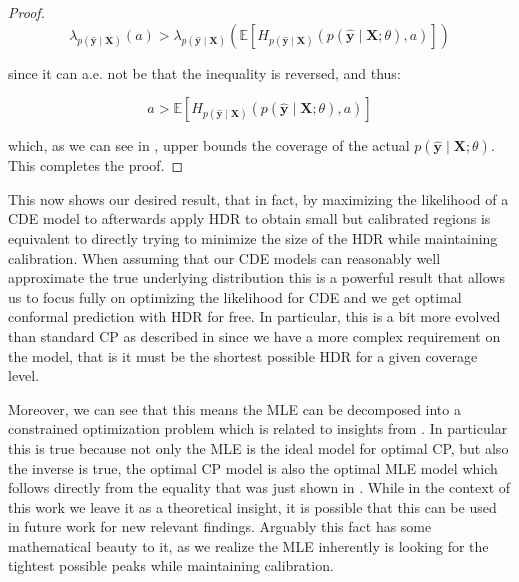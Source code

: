 \begin{proof}
    \begin{equation}
        \lambda_{p(\mathbf{\hat{y}}\mid\mathbf{X})}(a) > \lambda_{p(\mathbf{\hat{y}}\mid\mathbf{X})}\left(
        \mathbb{E}\left[H_{p(\hat{\mathbf{y}}\mid \mathbf{X})}(p(\mathbf{\hat{y}}\mid \mathbf{X};
            \theta), a)
            \right] \right)
    \end{equation}

    since it can a.e. not be that the inequality is reversed, and thus:

    \begin{equation}
        a > \mathbb{E}\left[H_{p(\hat{\mathbf{y}}\mid \mathbf{X})}(p(\mathbf{\hat{y}}\mid \mathbf{X};\theta), a)\right]
    \end{equation}

    which, as we can see in , upper bounds the coverage of the actual $p(\mathbf{\hat{y}}\mid \mathbf{X};\theta)$. This completes the proof.

\end{proof}
This now shows our desired result, that in fact, by maximizing the likelihood of a CDE model to afterwards apply HDR to obtain small but calibrated regions is equivalent to directly trying to minimize the size of the HDR while maintaining calibration. When assuming that our CDE models can reasonably well approximate the true underlying distribution this is a powerful result that allows us to focus fully on optimizing the likelihood for CDE and we get optimal conformal prediction with HDR for free. In particular, this is a bit more evolved than standard CP as described in  since we have a more complex requirement on the model, that is it must be the shortest possible HDR for a given coverage level.

Moreover, we can see that this means the MLE can be decomposed into a constrained optimization problem which is related to insights from \cite{chung2021beyond}. In particular this is true because not only the MLE is the ideal model for optimal CP, but also the inverse is true, the optimal CP model is also the optimal MLE model which follows directly from the equality that was just shown in . While in the context of this work we leave it as a theoretical insight, it is possible that this can be used in future work for new relevant findings. Arguably this fact has some mathematical beauty to it, as we realize the MLE inherently is looking for the tightest possible peaks while maintaining calibration. 

